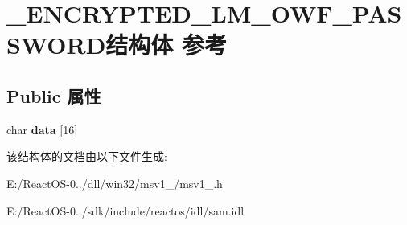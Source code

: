 \hypertarget{struct___e_n_c_r_y_p_t_e_d___l_m___o_w_f___p_a_s_s_w_o_r_d}{}\section{\+\_\+\+E\+N\+C\+R\+Y\+P\+T\+E\+D\+\_\+\+L\+M\+\_\+\+O\+W\+F\+\_\+\+P\+A\+S\+S\+W\+O\+R\+D结构体 参考}
\label{struct___e_n_c_r_y_p_t_e_d___l_m___o_w_f___p_a_s_s_w_o_r_d}
\subsection*{Public 属性}
\begin{DoxyCompactItemize}
\item 
\mbox{\label{struct___e_n_c_r_y_p_t_e_d___l_m___o_w_f___p_a_s_s_w_o_r_d_ac7302a10b5eadae35e43eb361a7122c4}} 
char {\bfseries data} \mbox{[}16\mbox{]}
\end{DoxyCompactItemize}


该结构体的文档由以下文件生成\+:\begin{DoxyCompactItemize}
\item 
E\+:/\+React\+O\+S-\/0../dll/win32/msv1\+\_/msv1\+\_.\+h\item 
E\+:/\+React\+O\+S-\/0../sdk/include/reactos/idl/sam.\+idl\end{DoxyCompactItemize}
